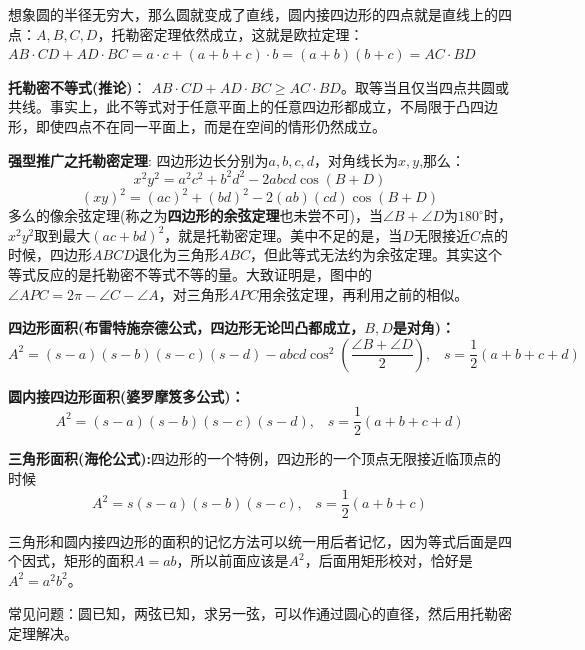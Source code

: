 \documentclass[../main.tex]{subfiles}
\begin{document}
想象圆的半径无穷大，那么圆就变成了直线，圆内接四边形的四点就是直线上的四点：$A,B,C,D$，托勒密定理依然成立，这就是欧拉定理：\\
$AB\cdot CD + AD\cdot BC=a\cdot c+(a+b+c)\cdot b=(a+b)(b+c) = AC\cdot BD$

\textbf{托勒密不等式(推论)}： $AB\cdot CD+ AD\cdot BC \ge AC\cdot BD$。取等当且仅当四点共圆或共线。事实上，此不等式对于任意平面上的任意四边形都成立，不局限于凸四边形，即使四点不在同一平面上，而是在空间的情形仍然成立。

\textbf{强型推广之托勒密定理}: 四边形边长分别为$a,b,c,d$，对角线长为$x,y$,那么：
$$x^2y^2=a^2c^2+b^2d^2-2abcd\cos(B+D)$$
$$ (xy)^2=(ac)^2+(bd)^2-2(ab)(cd)\cos(B+D)$$
多么的像余弦定理(称之为\textbf{四边形的余弦定理}也未尝不可)，当$\angle B+\angle D$为$180^{\circ}$时，$x^2y^2$取到最大$(ac+bd)^2$，就是托勒密定理。美中不足的是，当$D$无限接近$C$点的时候，四边形$ABCD$退化为三角形$ABC$，但此等式无法约为余弦定理。其实这个等式反应的是托勒密不等式不等的量。大致证明是，图中的$\angle APC = 2\pi -\angle C -\angle A$，对三角形$APC$用余弦定理，再利用之前的相似。

\textbf{四边形面积(布雷特施奈德公式，四边形无论凹凸都成立，$B,D$是对角)：}
\[A^2=(s-a)(s-b)(s-c)(s-d)-abcd\cos^2(\frac{\angle B+\angle D}{2}), \;\;\;s=\frac{1}{2}(a+b+c+d)\]

\textbf{圆内接四边形面积(婆罗摩笈多公式)：}
\[A^2=(s-a)(s-b)(s-c)(s-d), \;\;\;s=\frac{1}{2}(a+b+c+d)\]

\textbf{三角形面积(海伦公式):}四边形的一个特例，四边形的一个顶点无限接近临顶点的时候
\[A^2=s(s-a)(s-b)(s-c), \;\;\; s=\frac{1}{2}(a+b+c) \]

三角形和圆内接四边形的面积的记忆方法可以统一用后者记忆，因为等式后面是四个因式，矩形的面积$A=ab$，所以前面应该是$A^2$，后面用矩形校对，恰好是$A^2=a^2b^2$。

常见问题：圆已知，两弦已知，求另一弦，可以作通过圆心的直径，然后用托勒密定理解决。
\end{document}

